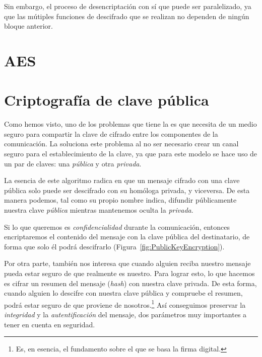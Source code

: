  Sin embargo, el proceso de desencriptación con  sí que puede ser paralelizado,
 ya que las mútiples funciones de descifrado que se realizan no dependen de ningún bloque anterior. \emph{\parencite{Reference24}}


 \section{AES}


 \section{Criptografía de clave pública}

 Como hemos visto, uno de los problemas que tiene la  es que necesita de un medio seguro para compartir la clave de cifrado entre los componentes de la comunicación.
 La  soluciona este problema al no ser necesario crear un canal seguro para el establecimiento de la clave, ya que para este modelo se hace uso de un par de claves: una \emph{pública} y otra \emph{privada}.

 La esencia de este algoritmo radica en que un mensaje cifrado con una clave pública solo puede ser descifrado con su homóloga privada, y viceversa.
 De esta manera podemos, tal como su propio nombre indica, difundir públicamente nuestra clave \emph{pública} mientras mantenemos oculta la \emph{privada}.

 Si lo que queremos es \emph{confidencialidad} durante la comunicación, entonces encriptaremos el contenido del mensaje con la clave pública del destinatario, de forma que solo él podrá descifrarlo (Figura~\ref{fig:PublicKeyEncryption}).

 Por otra parte, también nos interesa que cuando alguien reciba nuestro mensaje pueda estar seguro de que realmente es nuestro.
 Para lograr esto, lo que hacemos es cifrar un resumen del mensaje (\emph{hash}) con nuestra clave privada.
 De esta forma, cuando alguien lo descifre con nuestra clave pública y compruebe el resumen, podrá estar seguro de que proviene de nosotros.\footnote{Es, en esencia, el fundamento sobre el que se basa la firma digital.}
 Así conseguimos preservar la \emph{integridad} y la \emph{autentificación} del mensaje, dos parámetros muy importantes a tener en cuenta en seguridad. \emph{\parencite{Reference14}}

